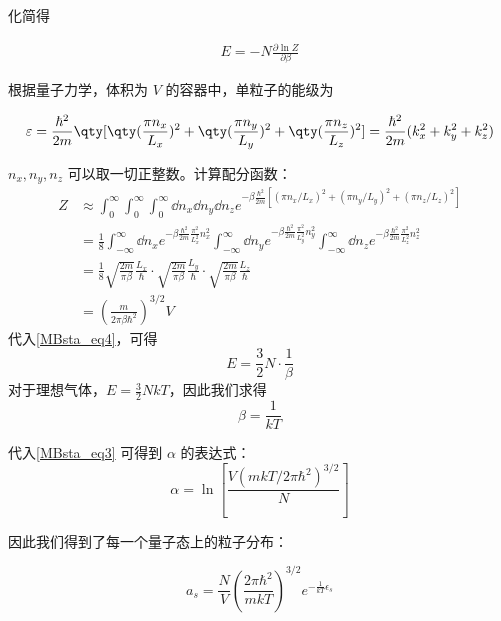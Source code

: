 化简得

\begin{equation}\label{MBsta_eq4}
\begin{aligned}
E=-N\frac{\partial \ln Z}{\partial \beta}
\end{aligned}
\end{equation}

根据量子力学，体积为 $V$ 的容器中，单粒子的能级为

\begin{equation}
\varepsilon = \frac{\hbar ^2}{2m} \qty[\qty(\frac{\pi n_x}{L_x})^2 + \qty(\frac{\pi n_y}{L_y})^2 + \qty(\frac{\pi n_z}{L_z})^2] = \frac{\hbar ^2}{2m} (k_x^2 + k_y^2 + k_z^2)
\end{equation}

$n_x,n_y,n_z$ 可以取一切正整数。计算配分函数：
\begin{equation}
\begin{aligned}
Z&\approx \int_{0}^\infty\int_{0}^\infty\int_{0}^\infty\dd n_x\dd n_y\dd n_z  e^{-\beta \frac{\hbar^2}{2m}[(\pi n_x/L_x)^2+(\pi n_y/L_y)^2+(\pi n_z/L_z)^2]}\\
&=\frac{1}{8}\int_{-\infty}^{\infty}\dd n_x e^{-\beta \frac{\hbar^2}{2m}\frac{\pi^2}{L_x^2}n_x^2}\int_{-\infty}^{\infty}\dd n_y e^{-\beta \frac{\hbar^2}{2m}\frac{\pi^2}{L_y^2}n_y^2}\int_{-\infty}^{\infty}\dd n_z e^{-\beta \frac{\hbar^2}{2m}\frac{\pi^2}{L_z^2}n_z^2}
\\
&=\frac{1}{8}\sqrt{\frac{2m}{\pi\beta}}\frac{L_x}{\hbar}\cdot \sqrt{\frac{2m}{\pi\beta}}\frac{L_y}{\hbar} \cdot \sqrt{\frac{2m}{\pi\beta}}\frac{L_z}{\hbar}
\\
&=\left(\frac{m}{2\pi\beta\hbar^2}\right)^{3/2}V
\end{aligned}
\end{equation}
代入\autoref{MBsta_eq4}，可得
\begin{equation}
E=\frac{3}{2}N\cdot \frac{1}{\beta}
\end{equation}
对于理想气体，$E=\frac{3}{2}N k T$，因此我们求得
\begin{equation}
\beta=\frac{1}{kT}
\end{equation}

代入\autoref{MBsta_eq3} 可得到 $\alpha$ 的表达式：
\begin{equation}\label{MBsta_eq8}
\alpha=\ln\left[\frac{V(m k T/2\pi \hbar^2)^{3/2}}{N}\right]
\end{equation}

因此我们得到了每一个量子态上的粒子分布：

\begin{equation}
a_s=\frac{N}{V}\left(\frac{2\pi \hbar^2}{m k T}\right)^{3/2} e^{-\frac{1}{k T}\epsilon_s}
\end{equation}

